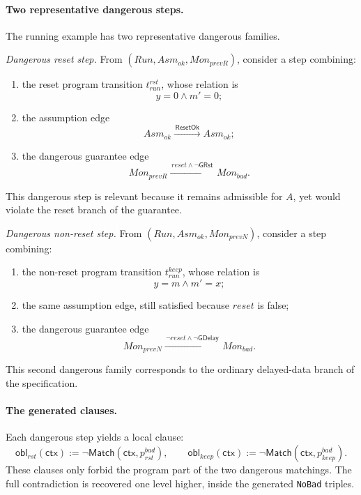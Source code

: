 \documentclass[11pt,a4paper]{article}
\newcommand{\Match}{\mathsf{Match}}
\newcommand{\ctx}{\mathsf{ctx}}
\newcommand{\ResetOk}{\mathsf{ResetOk}}
\newcommand{\GuardReset}{\mathsf{GRst}}
\newcommand{\GuardDelay}{\mathsf{GDelay}}
\begin{document}
\paragraph{Two representative dangerous steps.}
The running example has two representative dangerous families.

\emph{Dangerous reset step.}
From \((Run,Asm_{ok},Mon_{prevR})\), consider a step combining:
\begin{enumerate}[leftmargin=1.4em]
\item the reset program transition \(t_{run}^{rst}\), whose relation is
  \[
  y = 0 \land m' = 0;
  \]
\item the assumption edge
  \[
  Asm_{ok} \xrightarrow{\, \ResetOk \,} Asm_{ok};
  \]
\item the dangerous guarantee edge
  \[
  Mon_{prevR} \xrightarrow{\, reset \land \neg \GuardReset \,} Mon_{bad}.
  \]
\end{enumerate}
This dangerous step is relevant because it remains admissible for \(A\), yet
would violate the reset branch of the guarantee.

\emph{Dangerous non-reset step.}
From \((Run,Asm_{ok},Mon_{prevN})\), consider a step combining:
\begin{enumerate}[leftmargin=1.4em]
\item the non-reset program transition \(t_{run}^{keep}\), whose relation is
  \[
  y = m \land m' = x;
  \]
\item the same assumption edge, still satisfied because \(reset\) is false;
\item the dangerous guarantee edge
  \[
  Mon_{prevN} \xrightarrow{\, \neg reset \land \neg \GuardDelay \,} Mon_{bad}.
  \]
\end{enumerate}
This second dangerous family corresponds to the ordinary delayed-data branch of
the specification.

\paragraph{The generated clauses.}
Each dangerous step yields a local clause:
\[
\mathsf{obl}_{rst}(\ctx) := \neg \Match(\ctx,p_{rst}^{bad}),
\qquad
\mathsf{obl}_{keep}(\ctx) := \neg \Match(\ctx,p_{keep}^{bad}).
\]
These clauses only forbid the program part of the two dangerous matchings. The
full contradiction is recovered one level higher, inside the generated
\texttt{NoBad} triples.
\end{document}
